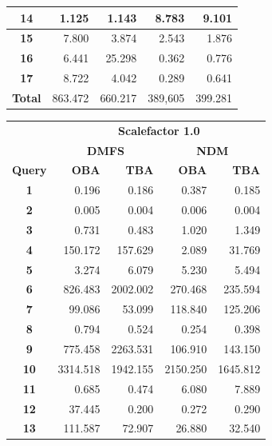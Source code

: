 \documentclass[a4paper]{article}
\begin{document}
\begin{figure}[h]
\begin{minipage}{0.5\linewidth}
\begin{tiny}
\begin{tabular}{|c|r|r|r|r|}
        \hline
        \textbf{14}&1.125&1.143&8.783&9.101\\
        \hline
        \textbf{15}&7.800&3.874&2.543&1.876\\
        \hline
        \textbf{16}&6.441&25.298&0.362&0.776\\
        \hline
        \textbf{17}&8.722&4.042&0.289&0.641\\
        \hline
        \textbf{Total}&863.472&660.217&389,605&399.281\\
        \hline
      \end{tabular}
    \end{tiny}
  \end{minipage}\hfill
\begin{minipage}{0.5\linewidth}
    \begin{tiny}
      \begin{tabular}{|c|r|r|r|r|}
        \hline
        &\multicolumn{4}{c|}{\textbf{Scalefactor 1.0}}\\
        \cline{2-5}
        &\multicolumn{2}{c|}{\textbf{DMFS}}&\multicolumn{2}{c|}{\textbf{NDM}}\\
        \hline
        \textbf{Query}&\textbf{OBA}&\textbf{TBA}&\textbf{OBA}&\textbf{TBA}\\
        \hline
        \textbf{1}&0.196&0.186&0.387&0.185\\
        \hline
        \textbf{2}&0.005&0.004&0.006&0.004\\
        \hline
        \textbf{3}&0.731&0.483&1.020&1.349\\
        \hline
        \textbf{4}&150.172&157.629&2.089&31.769\\
        \hline
         \textbf{5}&3.274&6.079&5.230&5.494\\
        \hline
        \textbf{6}&826.483&2002.002&270.468&235.594\\
        \hline
        \textbf{7}&99.086&53.099&118.840&125.206\\
        \hline
        \textbf{8}&0.794&0.524&0.254&0.398\\
        \hline
        \textbf{9}&775.458&2263.531&106.910&143.150\\
        \hline
        \textbf{10}&3314.518&1942.155&2150.250&1645.812\\
        \hline
        \textbf{11}&0.685&0.474&6.080&7.889\\
        \hline
        \textbf{12}&37.445&0.200&0.272&0.290\\
        \hline
        \textbf{13}&111.587&72.907&26.880&32.540\\

\end{tabular}
\end{tiny}
\end{minipage}
\end{figure}
\end{document}
